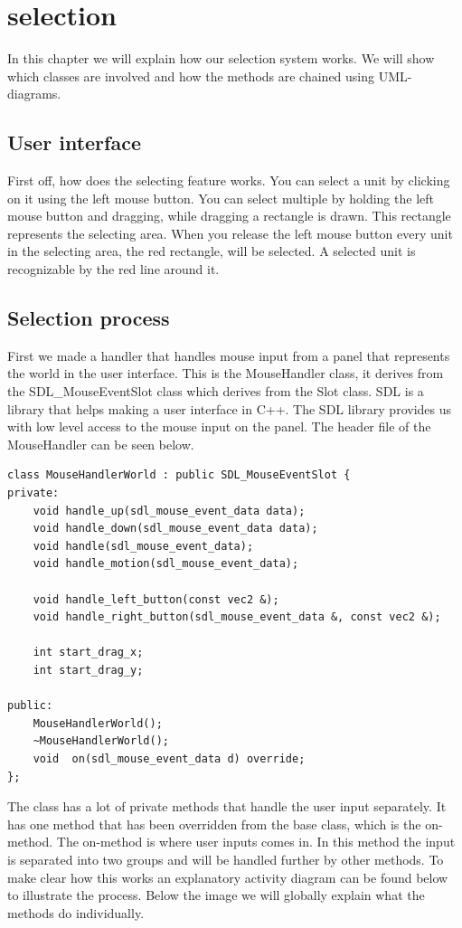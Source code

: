 
\section{selection}
In this chapter we will explain how our selection system works. We will show which classes are involved and how the methods are chained using UML-diagrams. 

\subsection{User interface}
First off, how does the selecting feature works. You can select a unit by clicking on it using the left mouse button. You can select multiple by holding the left mouse button and dragging, while dragging a rectangle is drawn. This rectangle represents the selecting area. When you release the left mouse button every unit in the selecting area, the red rectangle, will be selected. A selected unit is recognizable by the red line around it.

\subsection{Selection process}
First we made a handler that handles mouse input from a panel that represents the world in the user interface. This is the MouseHandler class, it derives from the SDL\_MouseEventSlot class which derives from the Slot class. SDL is a library that helps making a user interface in C++. The SDL library provides us with low level access to the mouse input on the panel. The header file of the MouseHandler can be seen below.

\begin{lstlisting}
class MouseHandlerWorld : public SDL_MouseEventSlot {
private:
    void handle_up(sdl_mouse_event_data data);
    void handle_down(sdl_mouse_event_data data);
    void handle(sdl_mouse_event_data);
    void handle_motion(sdl_mouse_event_data);

    void handle_left_button(const vec2 &);
    void handle_right_button(sdl_mouse_event_data &, const vec2 &);

    int start_drag_x;
    int start_drag_y;

public:
    MouseHandlerWorld();
    ~MouseHandlerWorld();
    void  on(sdl_mouse_event_data d) override;
};
\end{lstlisting}

The class has a lot of private methods that handle the user input separately. It has one method that has been overridden from the base class, which is the on-method. The on-method is where user inputs comes in. In this method the input is separated into two groups and will be handled further by other methods. To make clear how this works an explanatory activity diagram can be found below to illustrate the process. Below the image we will globally explain what the methods do individually. 

